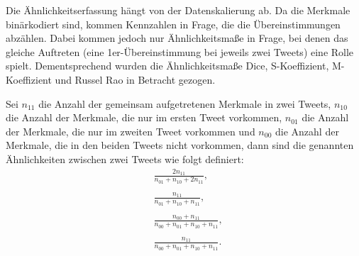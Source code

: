 Die Ähnlichkeitserfassung hängt von der Datenskalierung ab. 
Da die Merkmale bi\-när\-ko\-diert sind, kommen Kennzahlen in Frage, 
die die Übereinstimmungen abzählen. Dabei kommen jedoch nur 
Ähnlichkeitsmaße in Frage, bei denen das gleiche Auftreten 
(eine 1er-Übereinstimmung bei jeweils zwei Tweets) eine Rolle spielt. 
Dementsprechend wurden die Ähnlichkeitsmaße Dice, S-Koeffizient, M-Koeffizient und Russel Rao in Betracht gezogen.

Sei $n_{11}$ die Anzahl der gemeinsam aufgetretenen
Merkmale in zwei Tweets,  $n_{10}$ die Anzahl der Merkmale, die nur im ersten Tweet vorkommen,
$n_{01}$ die Anzahl der Merkmale, die nur im zweiten Tweet vorkommen und 
$n_{00}$ die Anzahl der Merkmale, die in den beiden Tweets nicht vorkommen, dann sind die genannten Ähnlichkeiten
zwi\-schen zwei Tweets wie folgt definiert:
\begin{align*}
& \frac{2n_{11}}{n_{01}+n_{10}+2n_{11}}, \tag{Dice} \\\\
& \frac{n_{11}}{n_{01}+n_{10}+n_{11}}, \tag{S-Koeffizient} \\\\
& \frac{n_{00}+n_{11}}{n_{00}+n_{01}+n_{10}+n_{11}}, \tag{M-Koeffizient}\\\\
& \frac{n_{11}}{n_{00}+n_{01}+n_{10}+n_{11}} \tag{Russel Rao}.
\end{align*}


